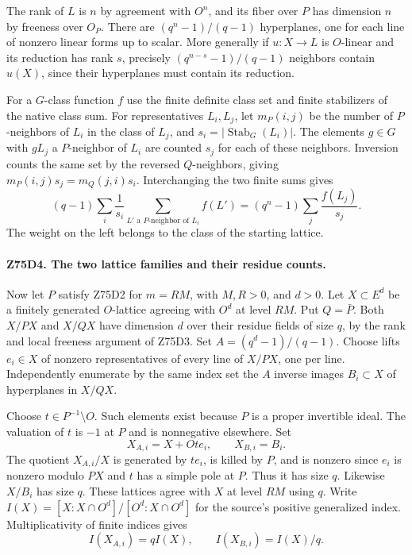 The rank of $L$ is $n$ by agreement with $O^n$, and its fiber over
$P$ has dimension $n$ by freeness over $O_P$. There are
$(q^n-1)/(q-1)$ hyperplanes, one for each line of nonzero linear
forms up to scalar. More generally if $u:X\to L$ is $O$-linear
and its reduction has rank $s$, precisely $(q^{n-s}-1)/(q-1)$
neighbors contain $u(X)$, since their hyperplanes must contain its
reduction.

For a $G$-class function $f$ use the finite definite class set
and finite stabilizers of the native class sum. For representatives
$L_i,L_j$, let $m_P(i,j)$ be the number of $P$-neighbors of $L_i$
in the class of $L_j$, and $s_i=|\operatorname{Stab}_G(L_i)|$.
The elements $g\in G$ with $gL_j$ a $P$-neighbor of $L_i$ are
counted $s_j$ for each of these neighbors. Inversion counts the
same set by the reversed $Q$-neighbors, giving
$m_P(i,j)s_j=m_Q(j,i)s_i$. Interchanging the two finite sums gives
\[
 (q-1)\sum_i\frac1{s_i}\sum_{L'\text{ a }P\text{-neighbor of }L_i}f(L')
   =(q^n-1)\sum_j\frac{f(L_j)}{s_j}.
\]
The weight on the left belongs to the class of the starting lattice.

\paragraph{Z75D4. The two lattice families and their residue counts.}
Now let $P$ satisfy Z75D2 for $m=RM$, with $M,R>0$, and $d>0$.
Let $X\subset E^d$ be a finitely generated $O$-lattice agreeing
with $O^d$ at level $RM$. Put $Q=\bar P$. Both $X/PX$ and $X/QX$
have dimension $d$ over their residue fields of size $q$, by the
rank and local freeness argument of Z75D3. Set $A=(q^d-1)/(q-1)$.
Choose lifts $e_i\in X$ of nonzero representatives of every line of
$X/PX$, one per line. Independently enumerate by the same index set
the $A$ inverse images $B_i\subset X$ of hyperplanes in $X/QX$.

Choose $t\in P^{-1}\setminus O$. Such elements exist because $P$ is a
proper invertible ideal. The valuation of $t$ is $-1$ at $P$ and is
nonnegative elsewhere. Set
\[
 X_{A,i}=X+Ote_i,\qquad X_{B,i}=B_i.
\]
The quotient $X_{A,i}/X$ is generated by $te_i$, is killed by $P$,
and is nonzero since $e_i$ is nonzero modulo $PX$ and $t$ has a
simple pole at $P$. Thus it has size $q$. Likewise $X/B_i$ has
size $q$. These lattices agree with $X$ at level $RM$ using $q$.
Write $I(X)=[X:X\cap O^d]/[O^d:X\cap O^d]$ for the source's
positive generalized index. Multiplicativity of finite indices gives
\[
 I(X_{A,i})=qI(X),\qquad I(X_{B,i})=I(X)/q.
\]

